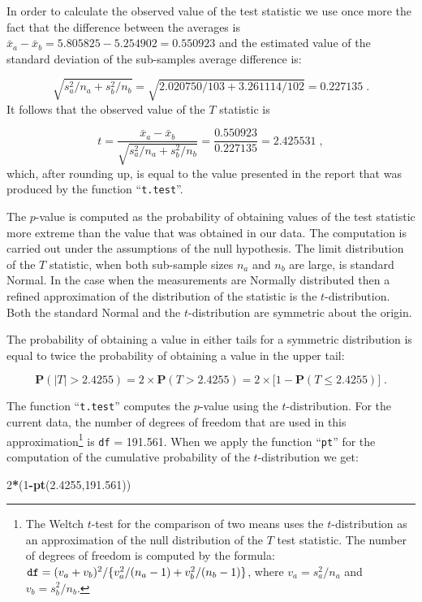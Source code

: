 \documentclass[
]{krantz}
\makeatletter
\newenvironment{Shaded}{\begin{snugshade}}{\end{snugshade}}
\newcommand{\DecValTok}[1]{\textcolor[rgb]{0.00,0.00,0.81}{#1}}
\newcommand{\FloatTok}[1]{\textcolor[rgb]{0.00,0.00,0.81}{#1}}
\newcommand{\KeywordTok}[1]{\textcolor[rgb]{0.13,0.29,0.53}{\textbf{#1}}}
\newcommand{\NormalTok}[1]{#1}
\newcommand{\OperatorTok}[1]{\textcolor[rgb]{0.81,0.36,0.00}{\textbf{#1}}}
\newcommand{\Prob}{\mathbf{P}}
\newenvironment{kframe}{%
\medskip{}
\setlength{\fboxsep}{.8em}
 \def\at@end@of@kframe{}%
 \ifinner\ifhmode%
  \def\at@end@of@kframe{\end{minipage}}%
  \begin{minipage}{\columnwidth}%
 \fi\fi%
 \def\FrameCommand##1{\hskip\@totalleftmargin \hskip-\fboxsep
 \colorbox{shadecolor}{##1}\hskip-\fboxsep
     \hskip-\linewidth \hskip-\@totalleftmargin \hskip\columnwidth}%
 \MakeFramed {\advance\hsize-\width
   \@totalleftmargin\z@ \linewidth\hsize
   \@setminipage}}%
 {\par\unskip\endMakeFramed%
 \at@end@of@kframe}
\renewenvironment{Shaded}{\begin{kframe}}{\end{kframe}}
\theoremstyle{definition}
\theoremstyle{definition}
\theoremstyle{definition}
\theoremstyle{remark}
\makeatother
\begin{document}
In order to calculate the observed value of the test statistic we use
once more the fact that the difference between the averages is
\(\bar x_a - \bar x_b = 5.805825 - 5.254902 = 0.550923\) and the
estimated value of the standard deviation of the sub-samples average
difference is:

\[\sqrt{s_a^2/n_a + s_b^2/n_b} = \sqrt{2.020750/103 + 3.261114/102} = 0.227135\;.\]
It follows that the observed value of the \(T\) statistic is

\[t = \frac{\bar x_a - \bar x_b}{\sqrt{s_a^2/n_a + s_b^2/n_b}} = \frac{0.550923}{0.227135} = 2.425531\;,\]
which, after rounding up, is equal to the value presented in the report
that was produced by the function ``\texttt{t.test}''.

The \(p\)-value is computed as the probability of obtaining values of the
test statistic more extreme than the value that was obtained in our
data. The computation is carried out under the assumptions of the null
hypothesis. The limit distribution of the \(T\) statistic, when both
sub-sample sizes \(n_a\) and \(n_b\) are large, is standard Normal. In the
case when the measurements are Normally distributed then a refined
approximation of the distribution of the statistic is the
\(t\)-distribution. Both the standard Normal and the \(t\)-distribution are
symmetric about the origin.

The probability of obtaining a value in either tails for a symmetric
distribution is equal to twice the probability of obtaining a value in
the upper tail:

\[\Prob( |T| > 2.4255) = 2 \times \Prob( T > 2.4255) =  2 \times \big [1 - \Prob( T \leq  2.4255)\big ]\;.\]

The function ``\texttt{t.test}'' computes the \(p\)-value using the
\(t\)-distribution. For the current data, the number of degrees of freedom
that are used in this approximation\footnote{The Weltch \(t\)-test for the comparison of two means uses the
  \(t\)-distribution as an approximation of the null distribution of the
  \(T\) test statistic. The number of degrees of freedom is computed by
  the formula:
  \(\mbox{\texttt{df}} = (v_a + v_b)^2/\{v_a^2/(n_a-1) + v_b^2/(n_b-1)\}\),
  where \(v_a = s_a^2/n_a\) and \(v_b = s_b^2/n_b\).} is \texttt{df} = 191.561. When we apply
the function ``\texttt{pt}'' for the computation of the cumulative probability of
the \(t\)-distribution we get:

\begin{Shaded}
\begin{Highlighting}[]
\DecValTok{2}\OperatorTok{*}\NormalTok{(}\DecValTok{1}\OperatorTok{-}\KeywordTok{pt}\NormalTok{(}\FloatTok{2.4255}\NormalTok{,}\FloatTok{191.561}\NormalTok{))}
\end{Highlighting}
\end{Shaded}
\end{document}
